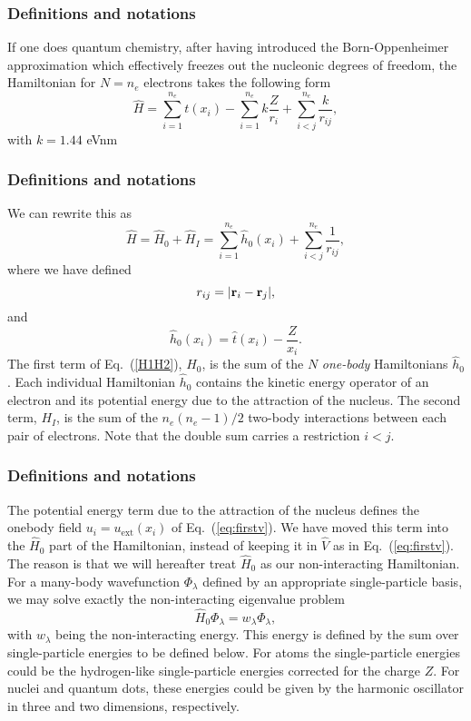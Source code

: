\documentclass{beamer}
\begin{document}
\begin{frame}
\frametitle{Definitions and notations}

\begin{block}{}
If one does quantum chemistry, after having introduced the  Born-Oppenheimer approximation which effectively freezes out the nucleonic degrees of freedom, the Hamiltonian for $N=n_e$ electrons takes the following form 
\[
  \hat{H} = \sum_{i=1}^{n_e} t(x_i) - \sum_{i=1}^{n_e} k\frac{Z}{r_i} + \sum_{i < j}^{n_e} \frac{k}{r_{ij}},
\]
with $k=1.44$ eVnm
\end{block}
\end{frame}

\begin{frame}
\frametitle{Definitions and notations}

\begin{block}{}
We can rewrite this as
\begin{equation}
    \hat{H} = \hat{H}_0 + \hat{H}_I 
    = \sum_{i=1}^{n_e}\hat{h}_0(x_i) + \sum_{i < j}^{n_e}\frac{1}{r_{ij}},
\label{H1H2}
\end{equation}
where  we have defined 
\[
r_{ij}=| {\bf r}_i-{\bf r}_j|,
\]
 and
\begin{equation}
  \hat{h}_0(x_i) =  \hat{t}(x_i) - \frac{Z}{x_i}.
\label{hi}
\end{equation}
The first term of Eq.~(\ref{H1H2}), $H_0$, is the sum of the $N$
\emph{one-body} Hamiltonians $\hat{h}_0$. Each individual
Hamiltonian $\hat{h}_0$ contains the kinetic energy operator of an
electron and its potential energy due to the attraction of the
nucleus. The second term, $H_I$, is the sum of the $n_e(n_e-1)/2$
two-body interactions between each pair of electrons. Note that the double sum carries a restriction $i < j$.
\end{block}
\end{frame}

\begin{frame}
\frametitle{Definitions and notations}

\begin{block}{}
The potential energy term due to the attraction of the nucleus defines the onebody field $u_i=u_{\mathrm{ext}}(x_i)$ of Eq.~(\ref{eq:firstv}).
We have moved this term into the $\hat{H}_0$ part of the Hamiltonian, instead of keeping  it in $\hat{V}$ as in  Eq.~(\ref{eq:firstv}).
The reason is that we will hereafter treat $\hat{H}_0$ as our non-interacting  Hamiltonian. For a many-body wavefunction $\Phi_{\lambda}$ defined by an  
appropriate single-particle basis, we may solve exactly the non-interacting eigenvalue problem 
\[
\hat{H}_0\Phi_{\lambda}= w_{\lambda}\Phi_{\lambda},
\]
with $w_{\lambda}$ being the non-interacting energy. This energy is defined by the sum over single-particle energies to be defined below.
For atoms the single-particle energies could be the hydrogen-like single-particle energies corrected for the charge $Z$. For nuclei and quantum
dots, these energies could be given by the harmonic oscillator in three and two dimensions, respectively.
\end{block}
\end{frame}
\end{document}
